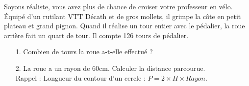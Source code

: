 Soyons réaliste, vous avez plus de chance de croiser votre professeur en vélo. Équipé d'un rutilant VTT Décath et de gros mollets, il grimpe la côte en petit plateau et grand pignon. Quand il réalise un tour entier avec le pédalier, la roue arrière fait un quart de tour. Il compte 126 tours de pédalier. 

\begin{enumerate}
  \item[1.] Combien de tours la roue a-t-elle effectué ?
  \item[2.] La roue a un rayon de 60cm. Calculer la distance parcourue. \\
    Rappel : Longueur du contour d'un cercle : $P = 2 \times \Pi \times Rayon$.   
\end{enumerate}

